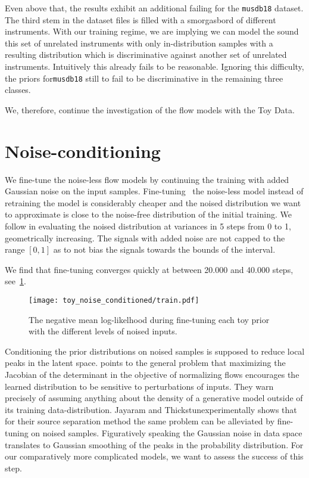 Even above that, the results exhibit an additional failing for the \texttt{musdb18} dataset. The third stem in the dataset files  is filled with a smorgasbord of different instruments. With our training regime, we are implying we can model the sound this set of unrelated instruments with only in-distribution samples with a resulting distribution which is discriminative against another set of unrelated instruments. Intuitively this already fails to be reasonable. Ignoring this difficulty, the priors for\texttt{musdb18} still to fail to be discriminative in the remaining three classes.

We, therefore, continue the investigation of the flow models with the Toy Data.

\section{Noise-conditioning}
We fine-tune the noise-less flow models by continuing the training with added Gaussian noise on the input samples. Fine-tuning~\cite{yosinskiHow2014} the noise-less model instead of retraining the model is considerably cheaper and the noised distribution we want to approximate is close to the noise-free distribution of the initial training. We follow \textcite{jayaramSource2020} in evaluating the noised distribution at variances in 5 steps from 0 to 1, geometrically increasing. The signals with added noise are not capped to the range \([0,1]\) as to not bias the signals towards the bounds of the interval.

We find that fine-tuning converges quickly at between 20.000 and 40.000 steps, see~\cref{fig:toy_noise_conditioned}.

\begin{figure}
    \texttt{[image: toy\_noise\_conditioned/train.pdf]}
    \caption{The negative mean log-likelhood during fine-tuning each toy prior with the different levels of noised inputs.}%
    \label{fig:toy_noise_conditioned}
\end{figure}


Conditioning the prior distributions on noised samples is supposed to reduce local peaks in the latent space. \textcite{nalisnickDeep2019} points to the general problem that maximizing the Jacobian of the determinant in the objective of normalizing flows encourages the learned distribution to be sensitive to perturbations of inputs. They warn precisely of assuming anything about the density of a generative model outside of its training data-distribution. Jayaram and Thickstun experimentally shows that for their source separation method the same problem can be alleviated by fine-tuning on noised samples. Figuratively speaking the Gaussian noise in data space translates to Gaussian smoothing of the peaks in the probability distribution. For our comparatively more complicated models, we want to assess the success of this step.

